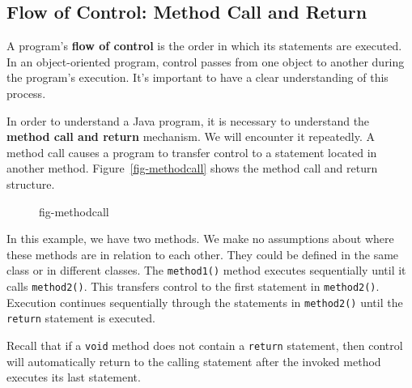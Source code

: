
\subsection{Flow of Control: Method Call and Return}
\label{sec-methodcall}


\noindent A program's {\bf flow of control} is the order
in which its statements are executed. In an object-oriented program,
control passes from one object to another during the program's
execution. It's important to have a clear understanding of this
process.

In order to understand a Java program, it is necessary to understand
the {\bf method call and return} mechanism. We will encounter it
repeatedly.  A method call causes a program to transfer control to a
statement located in another method. Figure~\ref{fig-methodcall} shows
the method call and return structure.
\begin{figure}[h!]
{fig-methodcall}
\end{figure}

In this example, we have two methods. We make no assumptions about
where these methods are in relation to each other. They could be
defined in the same class or in different classes. The {\tt method1()}
method executes sequentially until it calls {\tt method2()}.  This
transfers control to the first statement in {\tt method2()}. Execution
continues sequentially through the statements in {\tt method2()} until
the {\tt return} statement is executed.


\noindent Recall that if a {\tt void}
method does not contain a {\tt return} statement, then control will
automatically return to the calling statement after the invoked method
executes its last statement.



